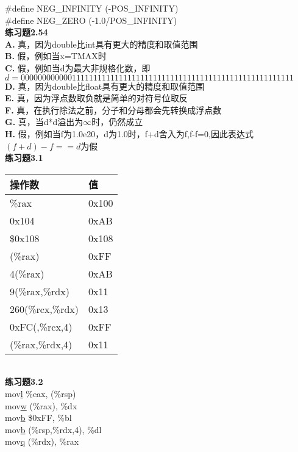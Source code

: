 \documentclass{article}
\begin{document}
\begin{CJK}{UTF8}{uyhei}
\#define NEG\_INFINITY	(-POS\_INFINITY)	\\
\#define NEG\_ZERO	(-1.0/POS\_INFINITY)	\\[3ex]
\textbf{练习题2.54}	\\[2ex]
\textbf{A.}	
真，因为double比int具有更大的精度和取值范围	\\
\textbf{B.}	
假，例如当x=TMAX时	\\
\textbf{C.}	
假，例如当d为最大非规格化数，即$d=0 00000000000 1111111111111111111111111111111111111111111111111111$	\\
\textbf{D.}	
真，因为double比float具有更大的精度和取值范围	\\
\textbf{E.}	
真，因为浮点数取负就是简单的对符号位取反	\\
\textbf{F.}	
真，在执行除法之前，分子和分母都会先转换成浮点数	\\
\textbf{G.}	
真，当d*d溢出为$\infty$时，仍然成立	\\
\textbf{H.}	
假，例如当f为1.0e20，d为1.0时，f+d舍入为f,f-f=0,因此表达式$(f+d)-f==d$为假	\\[2ex]
\textbf{练习题3.1}	\\
\begin{table}[htbp]
\centering
\begin{tabular}{|m{15em}<{\centering}|m{8em}<{\centering}|}
	\hline
	操作数	&	值	\\
	\hline
	\%rax	&	0x100	\\
	\hline
	0x104	&	0xAB	\\
	\hline
	\$0x108	&	0x108	\\
	\hline
	(\%rax)	&	0xFF	\\
	\hline
	4(\%rax)	&	0xAB	\\
	\hline
	9(\%rax,\%rdx)	&	0x11	\\
	\hline
	260(\%rcx,\%rdx)	&	0x13	\\
	\hline
	0xFC(,\%rcx,4)	&	0xFF	\\
	\hline
	(\%rax,\%rdx,4)	&	0x11	\\
	\hline
\end{tabular}
\end{table}	\\[2ex]
\newpage
\noindent\textbf{练习题3.2}	\\[2ex]
mov\underline{l} \%eax, (\%rsp)	\\
mov\underline{w} (\%rax), \%dx	\\
mov\underline{b} \$0xFF, \%bl	\\
mov\underline{b} (\%rsp,\%rdx,4), \%dl	\\
mov\underline{q} (\%rdx), \%rax	\\

\end{CJK}
\end{document}
